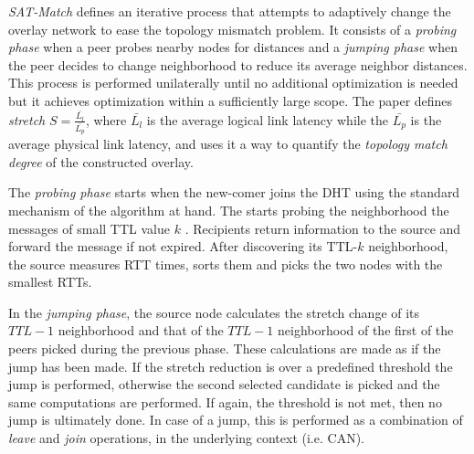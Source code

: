 
\emph{SAT-Match} \cite{RGJZ2004} defines an iterative process that attempts to
adaptively change the overlay network to ease the topology mismatch problem. It
consists of a \emph{probing phase} when a peer probes nearby nodes for distances
and a \emph{jumping phase} when the peer decides to change neighborhood to
reduce its average neighbor distances. This process is performed unilaterally
until no additional optimization is needed but it achieves optimization within a
sufficiently large scope.
The paper defines \emph{stretch}
$S = \frac{\bar{L_l}}{\bar{L_p}}$, where $\bar{L_l}$ is the average logical link
latency while the $\bar{L_p}$ is the average physical link latency, and uses it
a way to quantify the \emph{topology match degree} of the constructed overlay.

The \emph{probing phase} starts when the new-comer joins the DHT using the
standard mechanism of the algorithm at hand. The starts probing the neighborhood
the messages of small TTL value $k$ \cite{jiang_lightflood_2008}. Recipients return
information to the source and forward the message if not expired. After
discovering its TTL-$k$ neighborhood, the source measures RTT times, sorts them
and picks the two nodes with the smallest RTTs.

In the \emph{jumping phase}, the source node calculates the stretch change of
its $TTL-1$ neighborhood and that of the $TTL-1$ neighborhood of the first of
the peers picked during the previous phase. These calculations are made as if
the jump has been made. If the stretch reduction is over a predefined threshold
the jump is performed, otherwise the second selected candidate is picked and the
same computations are performed. If again, the threshold is not met, then no
jump is ultimately done. In case of a jump, this is performed as a combination
of \emph{leave} and \emph{join} operations, in the underlying context
(i.e. CAN).

